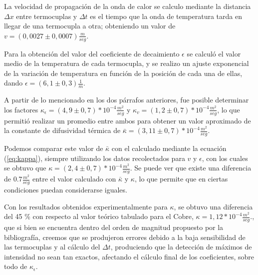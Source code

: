 \documentclass[twoside,twocolumn,a4paper]{article}
\begin{document}
\par
La velocidad de propagaci\'on de la onda de calor se calculo mediante la distancia $\Delta x$ entre termocuplas y $\Delta t$ es el tiempo que la onda de temperatura tarda en llegar de una termocupla a otra; obteniendo un valor de $v = (0,0027 \pm 0,0007) \frac{m}{seg}$. \newline

\par
Para la obtenci\'on del valor del coeficiente de decaimiento $\epsilon$ se calcul\'o el valor medio de la temperatura de cada termocupla, y se realizo un ajuste exponencial de la variaci\'on de temperatura en funci\'on de la posici\'on de cada una de ellas, dando $\epsilon = (6,1 \pm 0,3) \frac{1}{m}$. \newline

\par
A partir de lo mencionado en los dos p\'arrafos anteriores, fue posible determinar los factores $\kappa_{\epsilon} = (4,9 \pm 0,7) * 10^{-4} \frac{m^{2}}{seg}$ y $\kappa_{v} = (1,2 \pm 0,7) * 10^{-4} \frac{m^{2}}{seg}$, lo que permiti\'o realizar un promedio entre ambos para obtener un valor aproximado de la constante de difusividad t\'ermica de $\bar{\kappa} = (3,11 \pm 0,7) * 10^{-4}  \frac{m^{2}}{seg}$.

Podemos comparar este valor de $\bar{\kappa}$ con el calculado mediante la ecuaci\'on (\ref{eq:kappa}), siempre utilizando los datos recolectados para $v$ y $\epsilon$, con los cuales se obtuvo que $\kappa = (2,4 \pm 0,7) * 10^{-4} \frac{m^{2}}{seg}$. Se puede ver que existe una diferencia de $0.7\frac{m^{2}}{seg}$ entre el valor calculado con $\bar{\kappa}$ y $\kappa$, lo que permite que en ciertas condiciones puedan considerarse iguales. \newline

\par
Con los resultados obtenidos experimentalmente para $\kappa$, se obtuvo una diferencia del 45 \% con respecto al valor te\'orico tabulado para el Cobre, $\kappa = 1,12 * 10^{-4} \frac{m^{2}}{seg}$., que si bien se encuentra dentro del orden de magnitud propuesto por la bibliograf\'ia, creemos que se produjeron errores debido a la baja sensibilidad de las termocuplas y al c\'alculo del $\Delta t$, produciendo que la detecci\'on de m\'aximos de intensidad no sean tan exactos, afectando el c\'alculo final de los coeficientes, sobre todo de $\kappa_{\epsilon}$.
\end{document}
